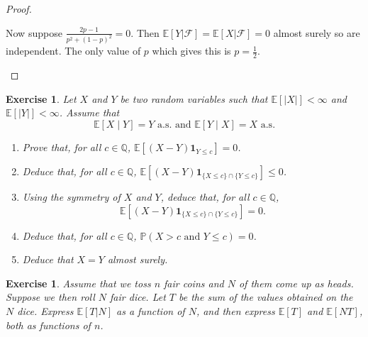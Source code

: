 \documentclass{article}
\newtheorem{exercise}[theorem]{Exercise}
\begin{document}
\begin{proof}
\begin{enumerate}
    Now suppose $\frac{2p-1}{p^2+(1-p)^2}=0$. Then $\mathbb{E}[Y|\mathcal{F}]=\mathbb{E}[X|\mathcal{F}]=0$ almost surely so are independent. The only value of $p$ which gives this is $p=\frac{1}{2}$.
\end{enumerate}
\end{proof}

\begin{exercise}
Let $X$ and $Y$ be two random variables such that $\mathbb{E}[|X|] < \infty$ and $\mathbb{E}[|Y|] < \infty$. Assume that
\[
\mathbb{E}[X \mid Y] = Y \text{ a.s. and } \mathbb{E}[Y \mid X] = X \text{ a.s.}
\]

\begin{enumerate}
    \item[(a)] Prove that, for all $c \in \mathbb{Q}$, $\mathbb{E}[(X - Y) \mathbf{1}_{Y \leq c}] = 0$.
    
    \item[(b)] Deduce that, for all $c \in \mathbb{Q}$, $\mathbb{E}[(X - Y) \mathbf{1}_{\{X \leq c\} \cap \{Y \leq c\}}] \leq 0$.
    
    \item[(c)] Using the symmetry of $X$ and $Y$, deduce that, for all $c \in \mathbb{Q}$, 
    \[
    \mathbb{E}[(X - Y) \mathbf{1}_{\{X \leq c\} \cap \{Y \leq c\}}] = 0.
    \]
    
    \item[(d)] Deduce that, for all $c \in \mathbb{Q}$, $\mathbb{P}(X > c \text{ and } Y \leq c) = 0$.
    
    \item[(e)] Deduce that $X = Y$ almost surely.
\end{enumerate}
\end{exercise}
\begin{exercise}
Assume that we toss $n$ fair coins and $N$ of them come up as heads. Suppose we then roll $N$ fair dice. Let $T$ be the sum of the values obtained on the $N$ dice. Express $\mathbb{E}[T|N]$ as a function of $N$, and then express $\mathbb{E}[T]$ and $\mathbb{E}[NT]$, both as functions of $n$.
\end{exercise}
\end{document}
